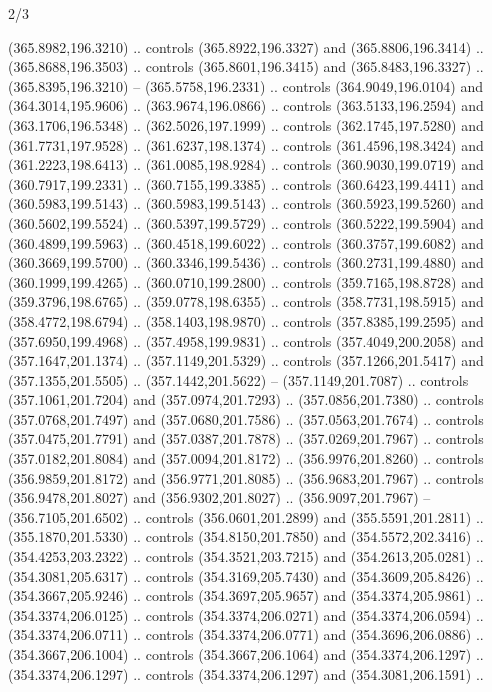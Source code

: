\begin{flagdescription}{2/3}
\begin{scope}[xshift=0.5\flaglength,yshift=0.5\flagwidth,scale=\flagwidth/495.65]
\begin{scope}[y=0.8pt, x=0.8pt, yscale=-1,shift={(-463.76,-309.78)}]
  (365.8982,196.3210) .. controls (365.8922,196.3327) and (365.8806,196.3414) ..
  (365.8688,196.3503) .. controls (365.8601,196.3415) and (365.8483,196.3327) ..
  (365.8395,196.3210) -- (365.5758,196.2331) .. controls (364.9049,196.0104) and
  (364.3014,195.9606) .. (363.9674,196.0866) .. controls (363.5133,196.2594) and
  (363.1706,196.5348) .. (362.5026,197.1999) .. controls (362.1745,197.5280) and
  (361.7731,197.9528) .. (361.6237,198.1374) .. controls (361.4596,198.3424) and
  (361.2223,198.6413) .. (361.0085,198.9284) .. controls (360.9030,199.0719) and
  (360.7917,199.2331) .. (360.7155,199.3385) .. controls (360.6423,199.4411) and
  (360.5983,199.5143) .. (360.5983,199.5143) .. controls (360.5923,199.5260) and
  (360.5602,199.5524) .. (360.5397,199.5729) .. controls (360.5222,199.5904) and
  (360.4899,199.5963) .. (360.4518,199.6022) .. controls (360.3757,199.6082) and
  (360.3669,199.5700) .. (360.3346,199.5436) .. controls (360.2731,199.4880) and
  (360.1999,199.4265) .. (360.0710,199.2800) .. controls (359.7165,198.8728) and
  (359.3796,198.6765) .. (359.0778,198.6355) .. controls (358.7731,198.5915) and
  (358.4772,198.6794) .. (358.1403,198.9870) .. controls (357.8385,199.2595) and
  (357.6950,199.4968) .. (357.4958,199.9831) .. controls (357.4049,200.2058) and
  (357.1647,201.1374) .. (357.1149,201.5329) .. controls (357.1266,201.5417) and
  (357.1355,201.5505) .. (357.1442,201.5622) -- (357.1149,201.7087) .. controls
  (357.1061,201.7204) and (357.0974,201.7293) .. (357.0856,201.7380) .. controls
  (357.0768,201.7497) and (357.0680,201.7586) .. (357.0563,201.7674) .. controls
  (357.0475,201.7791) and (357.0387,201.7878) .. (357.0269,201.7967) .. controls
  (357.0182,201.8084) and (357.0094,201.8172) .. (356.9976,201.8260) .. controls
  (356.9859,201.8172) and (356.9771,201.8085) .. (356.9683,201.7967) .. controls
  (356.9478,201.8027) and (356.9302,201.8027) .. (356.9097,201.7967) --
  (356.7105,201.6502) .. controls (356.0601,201.2899) and (355.5591,201.2811) ..
  (355.1870,201.5330) .. controls (354.8150,201.7850) and (354.5572,202.3416) ..
  (354.4253,203.2322) .. controls (354.3521,203.7215) and (354.2613,205.0281) ..
  (354.3081,205.6317) .. controls (354.3169,205.7430) and (354.3609,205.8426) ..
  (354.3667,205.9246) .. controls (354.3697,205.9657) and (354.3374,205.9861) ..
  (354.3374,206.0125) .. controls (354.3374,206.0271) and (354.3374,206.0594) ..
  (354.3374,206.0711) .. controls (354.3374,206.0771) and (354.3696,206.0886) ..
  (354.3667,206.1004) .. controls (354.3667,206.1064) and (354.3374,206.1297) ..
  (354.3374,206.1297) .. controls (354.3374,206.1297) and (354.3081,206.1591) ..

\end{scope}
\end{scope}
\end{flagdescription}
